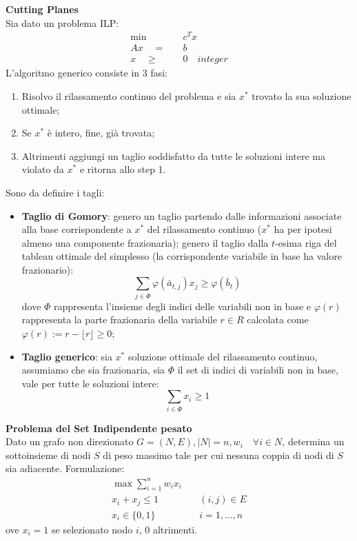 \textbf{Cutting Planes}\\
Sia dato un problema ILP:
\begin{equation*}
	\begin{aligned}
		\min \quad & \quad c^Tx\\
		Ax \quad = & \quad b\\
		x \quad \ge & \quad 0 \quad integer
	\end{aligned}
\end{equation*}
L'algoritmo generico consiste in 3 fasi:
\begin{enumerate}
	\item Risolvo il rilassamento continuo del problema e sia $x^*$ trovato la sua soluzione ottimale;
	\item Se $x^*$ è intero, fine, già trovata;
	\item Altrimenti aggiungi un taglio soddisfatto da tutte le soluzioni intere ma violato da $x^*$ e ritorna allo step 1.
\end{enumerate}
Sono da definire i tagli:
\begin{itemize}
	\item \textbf{Taglio di Gomory}: genero un taglio partendo dalle informazioni associate alla base corrispondente a $x^*$ del rilassamento continuo ($x^*$ ha per ipotesi almeno una componente frazionaria); genero il taglio dalla $t$-esima riga del tableau ottimale del simplesso (la corrispondente variabile in base ha valore frazionario):
	\begin{equation*}
		\sum_{j\in \Phi}\varphi (\bar{a}_{t,j})x_j\ge \varphi(\bar{b}_t)
	\end{equation*}
	dove $\Phi$ rappresenta l'insieme degli indici delle variabili non in base e $\varphi(r)$ rappresenta la parte frazionaria della variabile $r\in R$ calcolata come $\varphi (r):=r-\lfloor r \rfloor \ge 0$;
	\item \textbf{Taglio generico}: sia $x^*$ soluzione ottimale del rilassamento continuo, assumiamo che sia frazionaria, sia $\Phi$ il set di indici di variabili non in base, vale per tutte le soluzioni intere:
	\begin{equation*}
		\sum_{i\in \Phi}x_i\ge 1
	\end{equation*}
\end{itemize}

\textbf{Problema del Set Indipendente pesato}\\
Dato un grafo non direzionato $G=(N,E), |N|=n, w_i\quad \forall i \in N$, determina un sottoinsieme di nodi $S$ di peso massimo tale per cui nessuna coppia di nodi di $S$ sia adiacente.
Formulazione:
\begin{equation*}
	\begin{aligned}
		\max \sum_{i=1}^nw_ix_i\\
		x_i + x_j \le 1 \quad & \quad (i,j)\in E\\
		x_i \in \{0,1\} \quad & \quad i=1,\dots,n
	\end{aligned}
\end{equation*}
ove $x_i=1$ se selezionato nodo $i$, 0 altrimenti.

